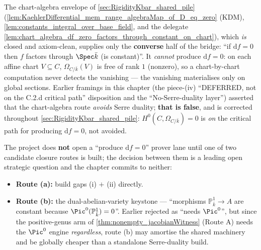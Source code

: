 \noindent The chart-algebra envelope of \cref{sec:RigidityKbar_shared_pile} (\cref{lem:KaehlerDifferential_mem_range_algebraMap_of_D_eq_zero} (KDM), \cref{lem:constants_integral_over_base_field}, and the delegate \cref{lem:chart_algebra_df_zero_factors_through_constant_on_chart}), which \emph{is} closed and axiom-clean, supplies only the \textbf{converse} half of the bridge: ``if \(\mathrm df = 0\) then \(f\) factors through \(\Spec \bar k\) (is constant)''. It \emph{cannot} produce \(\mathrm df = 0\): on each affine chart \(V \subseteq C\), \(\Omega_{C/\bar k}(V)\) is free of rank \(1\) (nonzero), so a chart-by-chart computation never detects the vanishing --- the vanishing materialises only on global sections. Earlier framings in this chapter (the piece-(iv) ``DEFERRED, not on the C.2.d critical path'' disposition and the ``No-Serre-duality layer'') asserted that the chart-algebra route \emph{avoids} Serre duality; \textbf{that is false}, and is corrected throughout \cref{sec:RigidityKbar_shared_pile}: \(H^0(C, \Omega_{C/\bar k}) = 0\) is \emph{on} the critical path for producing \(\mathrm df = 0\), not avoided.

The project does \textbf{not} open a ``produce \(\mathrm df = 0\)'' prover lane until one of two candidate closure routes is built; the decision between them is a leading open strategic question and the chapter commits to neither:
\begin{itemize}
  \item \textbf{Route (a):} build gaps (i) \(+\) (ii) directly.
  \item \textbf{Route (b):} the dual-abelian-variety keystone --- ``morphisms \(\mathbb P^1_{\bar k} \to A\) are constant because \(\Pic^0(\mathbb P^1_{\bar k}) = 0\)''. Earlier rejected as ``needs \(\Pic^0\)'', but since the positive-genus arm of \cref{thm:nonempty_jacobianWitness} (Route A) needs the \(\Pic^0\) engine \emph{regardless}, route (b) may amortise the shared machinery and be globally cheaper than a standalone Serre-duality build.
\end{itemize}

